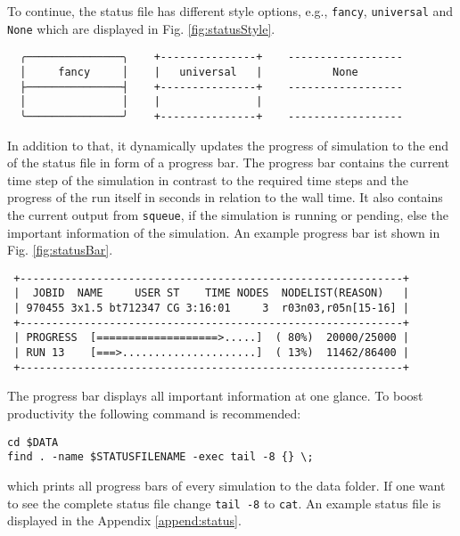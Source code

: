 To continue, the status file has different style options, e.g., \texttt{fancy}, \texttt{universal} and \texttt{None} which are displayed in Fig. \ref{fig:statusStyle}. 
\begin{center}
\captionsetup{type=figure}
\begin{verbatim}
  ╭───────────────╮    +---------------+    ------------------
  │     fancy     │    |   universal   |           None
  ├───────────────┤    +---------------+    ------------------
  │               │    |               |    
  ╰───────────────╯    +---------------+    ------------------
\end{verbatim}
\label{fig:statusStyle}
\end{center}
In addition to that, it dynamically updates the progress of simulation to the end of the status file in form of a progress bar. The progress bar contains the current time step of the simulation in contrast to the required time steps and the progress of the run itself in seconds in relation to the wall time. It also contains the current output from \texttt{squeue}, if the simulation is running or pending, else the important information of the simulation. An example progress bar ist shown in Fig. \ref{fig:statusBar}.
\begin{center}
\captionsetup{type=figure}
\begin{verbatim}
 +------------------------------------------------------------+
 |  JOBID  NAME     USER ST    TIME NODES  NODELIST(REASON)   |
 | 970455 3x1.5 bt712347 CG 3:16:01     3  r03n03,r05n[15-16] |
 +------------------------------------------------------------+
 | PROGRESS  [===================>.....]  ( 80%)  20000/25000 |
 | RUN 13    [===>.....................]  ( 13%)  11462/86400 |
 +------------------------------------------------------------+
\end{verbatim}
\label{fig:statusBar}
\end{center}
The progress bar displays all important information at one glance. To boost productivity the following command is recommended:
\begin{lstlisting}
cd $DATA 
find . -name $STATUSFILENAME -exec tail -8 {} \;
\end{lstlisting}
which prints all progress bars of every simulation to the data folder. If one want to see the complete status file change \texttt{tail -8} to \texttt{cat}.
An example status file is displayed in the Appendix \ref{append:status}.

